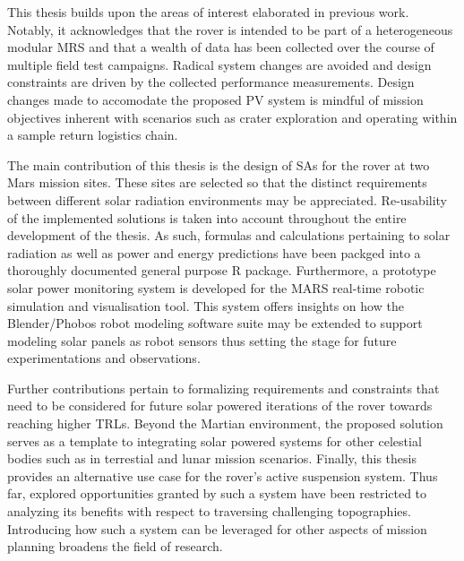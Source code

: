 This thesis builds upon the areas of interest elaborated in previous work. Notably, it acknowledges that the rover is intended to be part of a heterogeneous modular \ac{MRS} and that a wealth of data has been collected over the course of multiple field test campaigns. Radical system changes are avoided and design constraints are driven by the collected performance measurements. Design changes made to accomodate the proposed \ac{PV} system is mindful of mission objectives inherent with scenarios such as crater exploration and operating within a sample return logistics chain.

The main contribution of this thesis is the design of \acp{SA} for the rover at two Mars mission sites. These sites are selected so that the distinct requirements between different solar radiation environments may be appreciated. Re-usability of the implemented solutions is taken into account throughout the entire development of the thesis. As such, formulas and calculations pertaining to solar radiation as well as power and energy predictions have been packged into a thoroughly documented general purpose R package. Furthermore, a prototype solar power monitoring system is developed for the MARS real-time robotic simulation and visualisation tool. This system offers insights on how the Blender/Phobos robot modeling software suite may be extended to support modeling solar panels as robot sensors thus setting the stage for future experimentations and observations.

Further contributions pertain to formalizing requirements and constraints that need to be considered for future solar powered iterations of the rover towards reaching higher \acp{TRL}. Beyond the Martian environment, the proposed solution serves as a template to integrating solar powered systems for other celestial bodies such as in terrestial and lunar mission scenarios. Finally, this thesis provides an alternative use case for the rover's active suspension system. Thus far, explored opportunities granted by such a system have been restricted to analyzing its benefits with respect to traversing challenging topographies. Introducing how such a system can be leveraged for other aspects of mission planning broadens the field of research.
